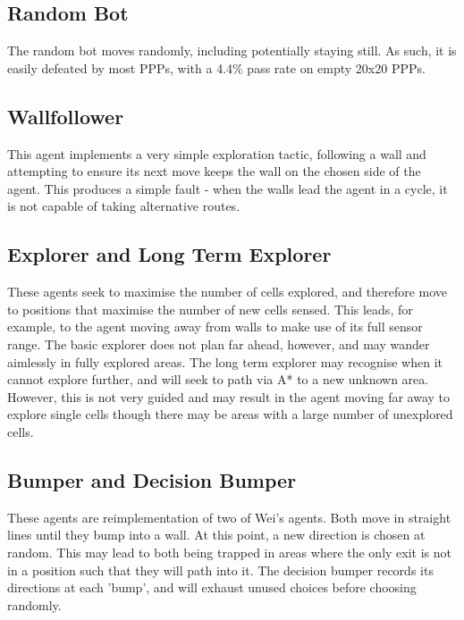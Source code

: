 \documentclass[authoryearcitations]{UoYCSproject}
\begin{document}
\subsection{Random Bot}
\label{sec:da_5_2}
The random bot moves randomly, including potentially staying still. As such, it is easily defeated by most PPPs, with a 4.4\% pass rate on empty 20x20 PPPs.

\subsection{Wallfollower}
\label{sec:da_5_3}
This agent implements a very simple exploration tactic, following a wall and attempting to ensure its next move keeps the wall on the chosen side of the agent. This produces a simple fault - when the walls lead the agent in a cycle, it is not capable of taking alternative routes.

\subsection{Explorer and Long Term Explorer}
\label{sec:da_5_4}
These agents seek to maximise the number of cells explored, and therefore move to positions that maximise the number of new cells sensed. This leads, for example, to the agent moving away from walls to make use of its full sensor range. The basic explorer does not plan far ahead, however, and may wander aimlessly in fully explored areas. The long term explorer may recognise when it cannot explore further, and will seek to path via A* to a new unknown area. However, this is not very guided and may result in the agent moving far away to explore single cells though there may be areas with a large number of unexplored cells.

\subsection{Bumper and Decision Bumper}
\label{sec:da_5_5}
These agents are reimplementation of two of Wei's agents. Both move in straight lines until they bump into a wall. At this point, a new direction is chosen at random. This may lead to both being trapped in areas where the only exit is not in a position such that they will path into it. The decision bumper records its directions at each 'bump', and will exhaust unused choices before choosing randomly.
\end{document}
